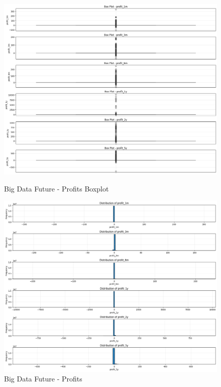 \documentclass[11pt,english,a4paper,hidelinks]{book}
\begin{document}
\begin{figure}[H]
    \centering
    \begin{minipage}{0.48\textwidth}
        \centering
        \includegraphics[width=\linewidth]{images/code/descriptive analysis/distributions/Big Data future - Profits Boxplot.png}
        \caption{Big Data Future - Profits Boxplot}
        \label{fig:big_data_future_profits_boxplot}
    \end{minipage}\hfill
    \begin{minipage}{0.48\textwidth}
        \centering
        \includegraphics[width=\linewidth]{images/code/descriptive analysis/distributions/Big Data Future - Profits.png}
        \caption{Big Data Future - Profits}
        \label{fig:big_data_future_profits}
    \end{minipage}
\end{figure}
\end{document}
